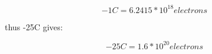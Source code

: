 \documentclass[11pt]{article}
\begin{document}
	\begin{equation}
		-1C = 6.2415 * 10^{18} electrons
	\end{equation}
	
	\begin{center}
		thus -25C gives:
	\end{center}
	
	\begin{equation}
		-25C = 1.6 * 10^{20} electrons
	\end{equation}
	
\end{document}
